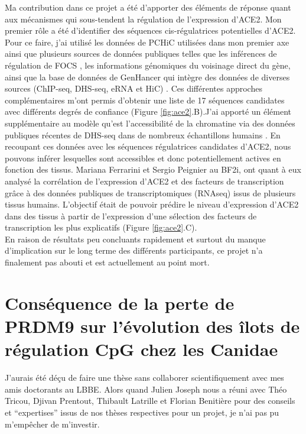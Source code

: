 Ma contribution dans ce projet a été d’apporter des éléments de réponse quant aux mécanismes qui sous-tendent la régulation de l’expression d’ACE2. Mon premier rôle a été d’identifier des séquences \gls{cis}-régulatrices potentielles d’ACE2. Pour ce faire, j’ai utilisé les données de PCHiC utilisées dans mon premier axe ainsi que plusieurs sources de données publiques telles que les inférences de régulation de FOCS \citep{hait_focs_2018}, les informations génomiques du voisinage direct du gène, ainsi que la base de données de GenHancer qui intègre des données de diverses sources (ChIP-seq, DHS-seq, eRNA et HiC) \citep{fishilevich_genehancer_2017}. Ces différentes approches complémentaires m’ont permis d’obtenir une liste de 17 séquences candidates avec différents degrés de confiance (Figure \ref{fig:ace2}.B).J’ai apporté un élément supplémentaire au modèle qu’est l’accessibilité de la chromatine via des données publiques récentes de DHS-seq dans de nombreux échantillons humains \citep{meuleman_index_2020}. En recoupant ces données avec les séquences régulatrices candidates d’ACE2, nous pouvons inférer lesquelles sont accessibles et donc potentiellement actives en fonction des tissus. Mariana Ferrarini et Sergio Peignier au BF2i, ont quant à eux analysé la corrélation de l'expression d'ACE2 et des facteurs de transcription grâce à des données publiques de transcriptomiques (RNAseq) issus de plusieurs tissus humains. L'objectif était de pouvoir prédire le niveau d'expression d'ACE2 dans des tissus à partir de l'expression d'une sélection des facteurs de transcription les plus explicatifs (Figure \ref{fig:ace2}.C). \\

En raison de résultats peu concluants rapidement et surtout du manque d'implication sur le long terme des différents participants, ce projet n’a finalement pas abouti et est actuellement au point mort.

\newpage
\section{Conséquence de la perte de PRDM9 sur l’évolution des îlots de régulation CpG chez les Canidae}
\label{annexe:canidae}

J'aurais été déçu de faire une thèse sans collaborer scientifiquement avec mes amis doctorants au LBBE. Alors quand Julien Joseph nous a réuni avec Théo Tricou, Djivan Prentout, Thibault Latrille et Florian Benitière pour des conseils et “expertises” issus de nos thèses respectives pour un projet, je n’ai pas pu m’empêcher de m’investir. \\

